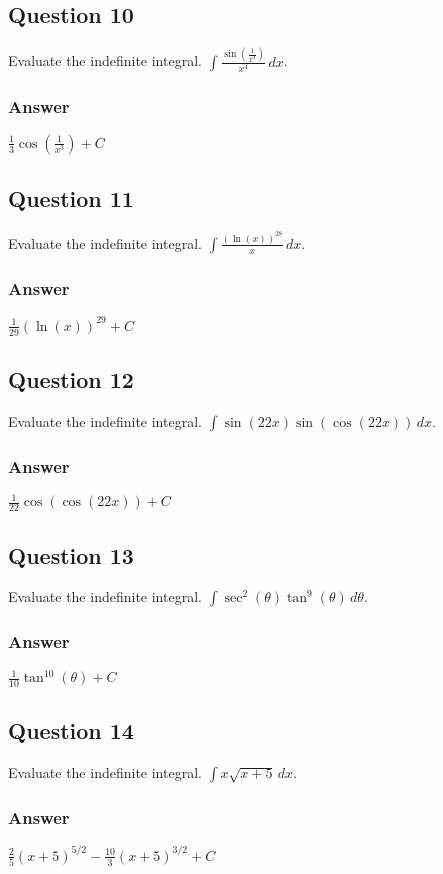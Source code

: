 \documentclass{article}
\begin{document}
\subsection*{Question 10}
Evaluate the indefinite integral. $\int \frac{\sin(\frac{1}{x^3})}{x^4} \,dx$.
\subsubsection*{Answer}
$ \frac{1}{3}\cos(\frac{1}{x^3}) + C $

\subsection*{Question 11}
Evaluate the indefinite integral. $\int \frac{(\ln(x))^{28}}{x} \,dx$.
\subsubsection*{Answer}
$ \frac{1}{29}(\ln(x))^{29} + C $

\subsection*{Question 12}
Evaluate the indefinite integral. $\int \sin(22x)\sin(\cos(22x)) \,dx$.
\subsubsection*{Answer}
$ \frac{1}{22}\cos(\cos(22x)) + C $

\subsection*{Question 13}
Evaluate the indefinite integral. $\int \sec^2(\theta)\tan^9(\theta) \,d\theta$.
\subsubsection*{Answer}
$ \frac{1}{10}\tan^{10}(\theta) + C $

\subsection*{Question 14}
Evaluate the indefinite integral. $\int x\sqrt{x+5} \,dx$.
\subsubsection*{Answer}
$ \frac{2}{5}(x+5)^{5/2} - \frac{10}{3}(x+5)^{3/2} + C $
\end{document}
